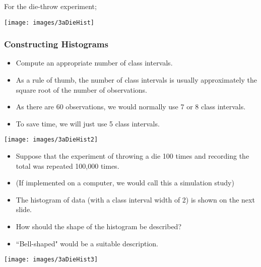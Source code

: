 \documentclass[]{report}
\begin{document}
For the die-throw experiment;
\begin{center}
	\texttt{[image: images/3aDieHist]}
\end{center}
%

\subsubsection{Constructing Histograms}
\begin{itemize}
	\item Compute an appropriate number of class intervals.
	\item As a rule of thumb, the number of class intervals is usually approximately the square root of the number of observations.
	\item As there are 60 observations, we would normally use 7 or 8 class intervals.
	\item To save time, we will just use 5 class intervals.
\end{itemize}




\begin{center}
	\texttt{[image: images/3aDieHist2]}
\end{center}

\begin{itemize}
	\item Suppose that the experiment of throwing a die 100 times and recording the total was repeated 100,000 times.
	\item (If implemented on a computer, we would call this a simulation study)
	\item The histogram of data (with a class interval width of 2) is shown on the next slide.
	\item How should the shape of the histogram be described?
	\item ``Bell-shaped" would be a suitable description.
\end{itemize}


\begin{center}
	\texttt{[image: images/3aDieHist3]}
\end{center}
\end{document}
